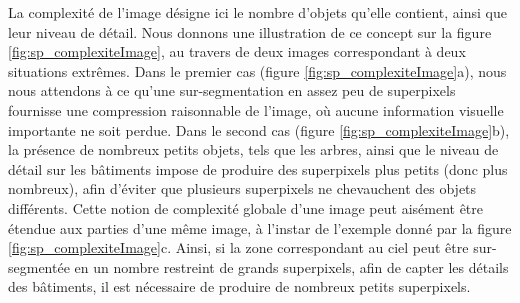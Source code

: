 La complexité de l'image désigne ici le nombre d'objets qu'elle contient, ainsi que leur niveau de détail. Nous donnons une illustration de ce concept sur la figure \ref{fig:sp_complexiteImage}, au travers de deux images correspondant à deux situations extrêmes.  Dans le premier cas (figure \ref{fig:sp_complexiteImage}a), nous nous attendons à ce qu'une sur-segmentation en assez peu de superpixels fournisse une compression raisonnable de l'image, où aucune information visuelle importante ne soit perdue. Dans le second cas (figure \ref{fig:sp_complexiteImage}b), la présence de nombreux petits objets, tels que les arbres, ainsi que le niveau de détail sur les bâtiments impose de produire des superpixels plus petits (donc plus nombreux), afin d'éviter que plusieurs superpixels ne chevauchent des objets différents. Cette notion de complexité globale d'une image peut aisément être étendue aux parties d'une même image, à l'instar de l'exemple donné par la figure \ref{fig:sp_complexiteImage}c. Ainsi, si la zone correspondant au ciel peut être sur-segmentée en un nombre restreint de grands superpixels, afin de capter les détails des bâtiments, il est nécessaire de produire de nombreux petits superpixels.
